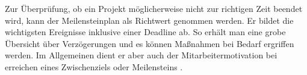 Zur Überprüfung, ob ein Projekt möglicherweise nicht zur richtigen Zeit beendet wird, kann der Meilensteinplan als Richtwert genommen werden. Er bildet die wichtigsten Ereignisse inklusive einer Deadline ab. So erhält man eine grobe Übersicht über Verzögerungen und es können Maßnahmen bei Bedarf ergriffen werden. Im Allgemeinen dient er aber auch der Mitarbeitermotivation bei erreichen eines Zwischenziels oder Meilensteins \cite{domendos:2016}. 